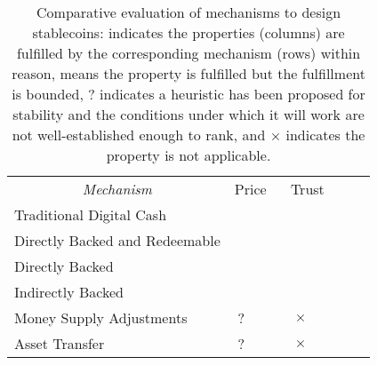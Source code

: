 
\begin{table}[t!]
\centering

	\begin{tabular}{ lllllllll}

&
\headrow{Corrects undervaluation} &
\headrow{Corrects overvaluation} &
\headrow{Decentralized issuance } &
\headrow{Decentralized redemption} &
\headrow{Decentralized transfer} &
\headrow{No trusted oracle} \\
\hline

	 \multicolumn{1}{c}{\textit{Mechanism} } &    \multicolumn{2}{|c|}{Price} &  \multicolumn{4}{c}{Trust}  \\

	\hline

	Traditional Digital Cash			& \multicolumn{1}{|c|}{\full} & \multicolumn{1}{c|}{\full}   & \multicolumn{1}{c|}{} & \multicolumn{1}{c|}{} & \multicolumn{1}{c|}{} & \multicolumn{1}{c}{\full}   \\

	\hline

	Directly Backed and Redeemable	& \multicolumn{1}{|c|}{\full} 	& \multicolumn{1}{c|}{\full}   & \multicolumn{1}{c|}{} 		& \multicolumn{1}{c|}{} 		& \multicolumn{1}{c|}{\full} & \multicolumn{1}{c}{\full}    \\
	Directly Backed                              	& \multicolumn{1}{|c|}{} 		& \multicolumn{1}{c|}{\full}   & \multicolumn{1}{c|}{ } 	& \multicolumn{1}{c|}{} 		& \multicolumn{1}{c|}{\full} & \multicolumn{1}{c}{\full}    \\
	Indirectly Backed 				& \multicolumn{1}{|c|}{\prt} 	& \multicolumn{1}{c|}{\full}   & \multicolumn{1}{c|}{\full} 	& \multicolumn{1}{c|}{\full} 	& \multicolumn{1}{c|}{\full} & \multicolumn{1}{c}{}    \\      
	Money Supply Adjustments             	& \multicolumn{1}{|c|}{?} 		& \multicolumn{1}{c|}{\full}   & \multicolumn{1}{c|}{\full} 	& \multicolumn{1}{c|}{$\times$} 		& \multicolumn{1}{c|}{\full} & \multicolumn{1}{c}{}    \\
	Asset Transfer	                                & \multicolumn{1}{|c|}{?} 		& \multicolumn{1}{c|}{\full}   & \multicolumn{1}{c|}{\full} 	& \multicolumn{1}{c|}{$\times$} 		& \multicolumn{1}{c|}{\full} & \multicolumn{1}{c}{}    \\
	\hline

	\end{tabular}
	\caption{Comparative evaluation of mechanisms to design stablecoins: {\full} indicates the properties (columns) are fulfilled by the corresponding mechanism (rows) within reason, {\prt} means the property is fulfilled but the fulfillment is bounded, {?} indicates a heuristic has been proposed for stability and the conditions under which it will work are not well-established enough to rank, and $\times$ indicates the property is not applicable.
	\label{tab:evframework}}
\end{table}